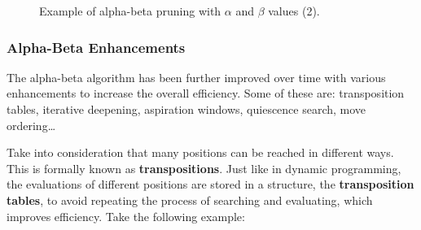 \begin{figure}[H]

    \caption{Example of alpha-beta pruning with $\alpha$ and $\beta$ values (2).}
    \label{fig:alpha-beta-pruning-with-alpha-beta-values-2}
\end{figure}

\subsubsection{Alpha-Beta Enhancements}

The alpha-beta algorithm has been further improved over time with various enhancements to increase the overall efficiency. Some of these are: transposition tables, iterative deepening, aspiration windows, quiescence search, move ordering\ldots

\vspace{1em}

\noindent Take into consideration that many positions can be reached in different ways. This is formally known as \textbf{transpositions}. Just like in dynamic programming, the evaluations of different positions are stored in a structure, the \textbf{transposition tables}, to avoid repeating the process of searching and evaluating, which improves efficiency. Take the following example:

\vspace{-2em}

